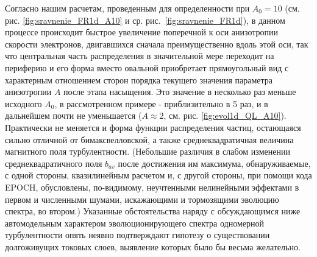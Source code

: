 Согласно нашим расчетам, проведенным для определенности при $A_0=10$ (см. рис. \ref{fig:sravnenie_FR1d_A10} и ср. рис.~\ref{fig:sravnenie_FR1d}), в данном процессе происходит быстрое увеличение поперечной к оси анизотропии скорости электронов, двигавшихся сначала преимущественно вдоль этой оси, так что центральная часть распределения в значительной мере переходит на периферию и его форма вместо овальной приобретает прямоугольный вид с характерным отношением сторон порядка текущего значения параметра анизотропии $A$ после этапа насыщения. Это значение в несколько раз меньше исходного $A_0$, в рассмотренном примере - приблизительно в 5 раз, и в дальнейшем почти не уменьшается ($A\approx 2$, см. рис. \ref{fig:evol1d_QL_A10}). Практически не меняется и форма функции распределения частиц, остающаяся сильно отличной от бимаксвелловской, а также среднеквадратичная величина магнитного поля турбулентности. (Небольшие различия в слабом изменении среднеквадратичного поля $b_{av}$ после достижения им максимума, обнаруживаемые, с одной стороны, квазилинейным расчетом и, с другой стороны, при помощи кода EPOCH, обусловлены, по-видимому, неучтенными нелинейными эффектами в первом и численными шумами, искажающими и тормозящими эволюцию спектра, во втором.) Указанные обстоятельства наряду с обсуждающимся ниже автомодельным характером эволюционирующего спектра одномерной турбулентности опять неявно подтверждают гипотезу о существовании долгоживущих токовых слоев, выявление которых было бы весьма желательно. 

